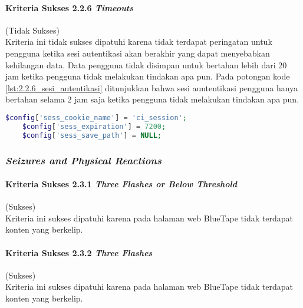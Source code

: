 \paragraph{Kriteria Sukses 2.2.6 \textit{Timeouts}}
\label{par:kepatuhan_bluetape_kriteria_sukses_2.2.6}
(Tidak Sukses)\\

Kriteria ini tidak sukses dipatuhi karena tidak terdapat peringatan untuk pengguna ketika sesi autentikasi akan berakhir yang dapat menyebabkan kehilangan data. Data pengguna tidak disimpan untuk bertahan lebih dari 20 jam ketika pengguna tidak melakukan tindakan apa pun. Pada potongan kode \ref{lst:2.2.6_sesi_autentikasi} ditunjukkan bahwa sesi auntentikasi pengguna hanya bertahan selama 2 jam saja ketika pengguna tidak melakukan tindakan apa pun.

\begin{lstlisting}[frame=single, label={lst:2.2.6_sesi_autentikasi}, language=PHP, caption=Kriteria Sukses 2.2.6 - Sesi Autentikasi]
    $config['sess_cookie_name'] = 'ci_session';
    $config['sess_expiration'] = 7200;
    $config['sess_save_path'] = NULL;
\end{lstlisting}

\subsubsection{\textit{Seizures and Physical Reactions}}
\label{subsubsec:kepatuhan_bluetape_seizures_and_physical_reactions}

\paragraph{Kriteria Sukses 2.3.1 \textit{Three Flashes or Below Threshold}}
\label{par:kepatuhan_bluetape_kriteria_sukses_2.3.1}
(Sukses)\\

Kriteria ini sukses dipatuhi karena pada halaman web BlueTape tidak terdapat konten yang berkelip.

\paragraph{Kriteria Sukses 2.3.2 \textit{Three Flashes}}
\label{par:kepatuhan_bluetape_kriteria_sukses_2.3.2}
(Sukses)\\

Kriteria ini sukses dipatuhi karena pada halaman web BlueTape tidak terdapat konten yang berkelip.

